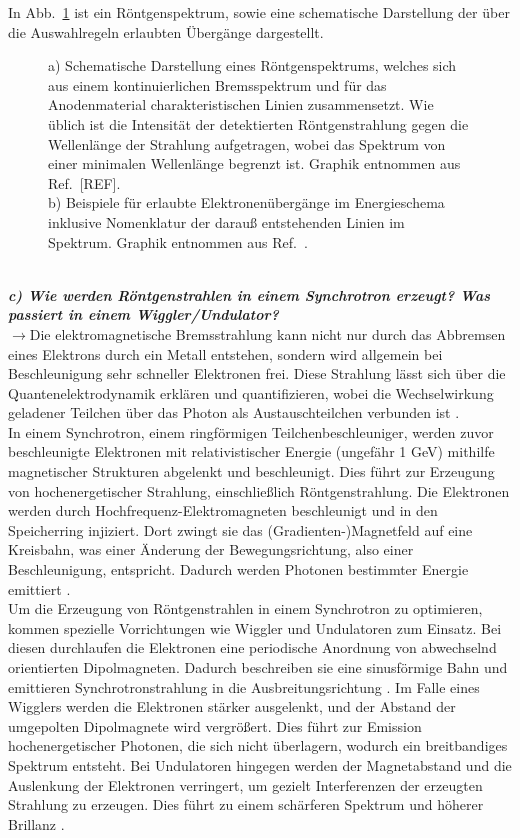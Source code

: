 In Abb.~\ref{fig:char} ist ein Röntgenspektrum, sowie eine schematische Darstellung der 
über die Auswahlregeln erlaubten Übergänge dargestellt.
\begin{figure}[h!]
    \centering
    \qquad
    \caption{\label{fig:char}a) Schematische Darstellung eines Röntgenspektrums, welches sich aus 
    einem kontinuierlichen Bremsspektrum und für das Anodenmaterial charakteristischen Linien zusammensetzt. 
    Wie üblich ist die Intensität der detektierten Röntgenstrahlung gegen die Wellenlänge der Strahlung aufgetragen, 
    wobei das Spektrum von einer minimalen Wellenlänge begrenzt ist. Graphik entnommen aus Ref.~[REF].\\
    b) Beispiele für erlaubte Elektronenübergänge im Energieschema inklusive Nomenklatur der darauß entstehenden Linien 
    im Spektrum. Graphik entnommen aus Ref.~\cite{Kristall}.}
\end{figure}\FloatBarrier \,\\

\textbf{\textit{c) Wie werden Röntgenstrahlen in einem Synchrotron erzeugt? Was passiert
in einem Wiggler/Undulator?}}\\
$\rightarrow$Die elektromagnetische Bremsstrahlung kann nicht nur durch das Abbremsen eines 
Elektrons durch ein Metall entstehen, sondern wird allgemein bei Beschleunigung sehr schneller 
Elektronen frei. Diese Strahlung lässt sich über die Quantenelektrodynamik erklären und 
quantifizieren, wobei die Wechselwirkung geladener Teilchen über das Photon als Austauschteilchen
verbunden ist \cite{Brems}. \\
In einem Synchrotron, einem ringförmigen Teilchenbeschleuniger, 
werden zuvor beschleunigte Elektronen mit relativistischer Energie (ungefähr 1 GeV) 
mithilfe magnetischer Strukturen abgelenkt und beschleunigt. 
Dies führt zur Erzeugung von hochenergetischer Strahlung, einschließlich Röntgenstrahlung. 
Die Elektronen werden durch Hochfrequenz-Elektromagneten beschleunigt und 
in den Speicherring injiziert. 
Dort zwingt sie das (Gradienten-)Magnetfeld auf eine Kreisbahn, 
was einer Änderung der Bewegungsrichtung, also einer Beschleunigung, entspricht. 
Dadurch werden Photonen bestimmter Energie emittiert \cite{Brems}. \\
Um die Erzeugung von Röntgenstrahlen in einem Synchrotron zu optimieren, 
kommen spezielle Vorrichtungen wie Wiggler und Undulatoren zum Einsatz. 
Bei diesen durchlaufen die Elektronen eine periodische Anordnung von abwechselnd 
orientierten Dipolmagneten. 
Dadurch beschreiben sie eine sinusförmige Bahn und emittieren Synchrotronstrahlung 
in die Ausbreitungsrichtung \cite{Wiggler}. 
Im Falle eines Wigglers werden die Elektronen stärker ausgelenkt, 
und der Abstand der umgepolten Dipolmagnete wird vergrößert. 
Dies führt zur Emission hochenergetischer Photonen, die sich nicht überlagern, 
wodurch ein breitbandiges Spektrum entsteht. 
Bei Undulatoren hingegen werden der Magnetabstand und die Auslenkung 
der Elektronen verringert, um gezielt Interferenzen der erzeugten Strahlung zu erzeugen. 
Dies führt zu einem schärferen Spektrum und höherer Brillanz \cite{Brillanz}.